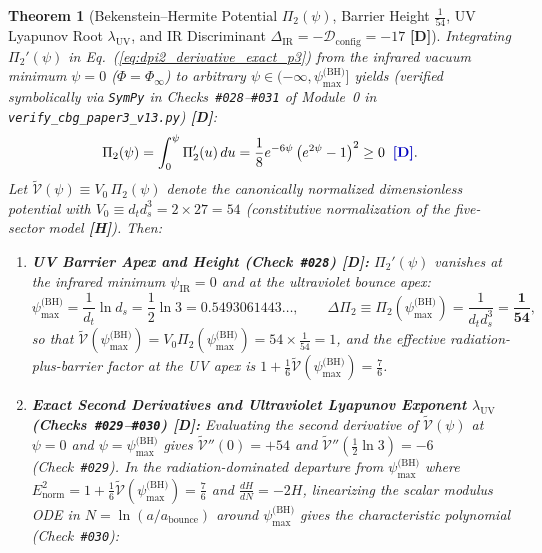 \documentclass[11pt,a4paper]{article}
\newcommand{\catD}{\textbf{\textcolor{blue!75!black}{[D]}}}
\newcommand{\catH}{\textbf{\textcolor{orange!85!black}{[H]}}}
\theoremstyle{plain}
\newtheorem{theorem}{Theorem}[section]
\theoremstyle{definition}
\theoremstyle{remark}
\numberwithin{equation}{section}
\begin{document}
\begin{theorem}[Bekenstein--Hermite Potential $\Pi_2(\psi)$, Barrier Height $\frac{1}{54}$, UV Lyapunov Root $\lambda_{\text{UV}}$, and IR Discriminant $\Delta_{\text{IR}} = -\mathcal{D}_{\text{config}} = -17$ \catD]
\label{thm:bekenstein_hermite_barrier_p3}
Integrating $\Pi_2'(\psi)$ in Eq.~(\ref{eq:dpi2_derivative_exact_p3}) from the infrared vacuum minimum $\psi = 0$ ($\Phi = \Phi_{\infty}$) to arbitrary $\psi \in (-\infty, \psi_{\max}^{\text{(BH)}}]$ yields (verified symbolically via \texttt{SymPy} in Checks~\texttt{\#028}--\texttt{\#031} of Module~0 in \allowbreak\texttt{verify\_cbg\_paper3\_v13.py}) \catD:
\begin{equation}
  \Pi_2(\psi) = \int_0^{\psi} \Pi_2'(u)\,du = \frac{1}{8}e^{-6\psi}\left(e^{2\psi} - 1\right)^2 \ge 0 \;\;\catD.
  \label{eq:pi2_potential_exact_p3}
\end{equation}
Let $\widetilde{\mathcal{V}}(\psi) \equiv V_0\,\Pi_2(\psi)$ denote the canonically normalized dimensionless potential with $V_0 \equiv d_t d_s^3 = 2 \times 27 = 54$ (constitutive normalization of the five-sector model \catH). Then:
\begin{enumerate}
  \item[\textnormal{(i)}] \textbf{UV Barrier Apex and Height (Check~\texttt{\#028}) \catD:} $\Pi_2'(\psi)$ vanishes at the infrared minimum $\psi_{\text{IR}} = 0$ and at the ultraviolet bounce apex:
  \begin{equation}
    \psi_{\max}^{\text{(BH)}} = \frac{1}{d_t}\ln d_s = \frac{1}{2}\ln 3 = 0.5493061443\dots, \qquad \Delta\Pi_2 \equiv \Pi_2\!\left(\psi_{\max}^{\text{(BH)}}\right) = \frac{1}{d_t d_s^3} = \mathbf{\frac{1}{54}},
    \label{eq:bekenstein_barrier_height_p3}
  \end{equation}
  so that $\widetilde{\mathcal{V}}(\psi_{\max}^{\text{(BH)}}) = V_0\Pi_2(\psi_{\max}^{\text{(BH)}}) = 54 \times \frac{1}{54} = 1$, and the effective radiation-plus-barrier factor at the UV apex is $1 + \frac{1}{6}\widetilde{\mathcal{V}}(\psi_{\max}^{\text{(BH)}}) = \frac{7}{6}$.
  \item[\textnormal{(ii)}] \textbf{Exact Second Derivatives and Ultraviolet Lyapunov Exponent $\lambda_{\text{UV}}$ (Checks~\texttt{\#029}--\texttt{\#030}) \catD:} Evaluating the second derivative of $\widetilde{\mathcal{V}}(\psi)$ at $\psi = 0$ and $\psi = \psi_{\max}^{\text{(BH)}}$ gives $\widetilde{\mathcal{V}}''(0) = +54$ and $\widetilde{\mathcal{V}}''(\frac{1}{2}\ln 3) = -6$ (Check~\texttt{\#029}). In the radiation-dominated departure from $\psi_{\max}^{\text{(BH)}}$ where $E_{\text{norm}}^2 = 1 + \frac{1}{6}\widetilde{\mathcal{V}}(\psi_{\max}^{\text{(BH)}}) = \frac{7}{6}$ and $\frac{dH}{dN} = -2H$, linearizing the scalar modulus ODE in $N = \ln(a/a_{\text{bounce}})$ around $\psi_{\max}^{\text{(BH)}}$ gives the characteristic polynomial (Check~\texttt{\#030}):

\end{enumerate}
\end{theorem}
\end{document}
